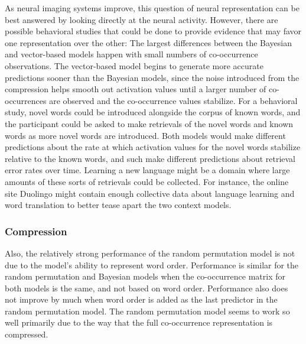 \documentclass[man,floatsintext,donotrepeattitle]{apa6}
\begin{document}
As neural imaging systems improve, this question of neural representation can be best answered by looking directly at the neural activity.
However, there are possible behavioral studies that could be done to provide evidence that may favor one representation over the other:
The largest differences between the Bayesian and vector-based models happen with small numbers of co-occurrence observations.
The vector-based model begins to generate more accurate predictions sooner than the Bayesian models,
since the noise introduced from the compression helps smooth out activation values until a larger number of co-occurrences are observed and the co-occurrence values stabilize.
For a behavioral study, novel words could be introduced alongside the corpus of known words, and the participant could be asked to make retrievals of the novel words and known words as more novel words are introduced.
Both models would make different predictions about the rate at which activation values for the novel words stabilize relative to the known words, and such make different predictions about retrieval error rates over time.
Learning a new language might be a domain where large amounts of these sorts of retrievals could be collected.
For instance, the online site Duolingo might contain enough collective data about language learning and word translation to better tease apart the two context models.

\subsubsection{Compression}

Also, the relatively strong performance of the random permutation model is not due to the model's ability to represent word order.
Performance is similar for the random permutation and Bayesian models when the co-occurrence matrix for both models is the same, and not based on word order.
Performance also does not improve by much when word order is added as the last predictor in the random permutation model.
The random permutation model seems to work so well primarily due to the way that the full co-occurrence representation is compressed.
\end{document}
